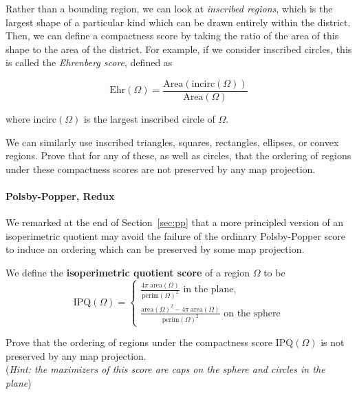 Rather than a bounding region, we can look at \textit{inscribed regions}, which is the largest  shape of a particular kind which can be drawn entirely within the district.  Then, we can define a compactness score by taking the ratio of the area of this shape to the area of the district.  For example, if we consider inscribed circles, this is called the \textit{Ehrenberg score}, defined as

$$\mathrm{Ehr}(\Omega) = \frac{\mathrm{Area}(\mathrm{incirc}(\Omega))}{\mathrm{Area}(\Omega)}$$

where $\mathrm{incirc}(\Omega)$ is the largest inscribed circle of $\Omega$.

We can similarly use inscribed triangles, squares, rectangles, ellipses, or convex regions.  Prove that for any of these, as well as circles, that the ordering of regions under these compactness scores are not preserved by any map projection.



\paragraph{Polsby-Popper, Redux}
We remarked at the end of Section~\ref{sec:pp} that a more principled version of an isoperimetric quotient may avoid the failure of the ordinary Polsby-Popper score to induce an ordering which can be preserved by some map projection.

	We define the \textbf{isoperimetric quotient score} of a region $\Omega$ to be$$
	\mathrm{IPQ}(\Omega)=
	\begin{cases}
	\frac{4\pi \ \mathrm{area}(\Omega)}{\mathrm{perim}(\Omega)^2} \text{ in the plane},\\[10pt]
	\frac{\mathrm{area}(\Omega)^2 - 4\pi \ \mathrm{area}(\Omega)}{\mathrm{perim}(\Omega)^2}\text{ on the sphere}
	\end{cases}
	$$

Prove that the ordering of regions  under the compactness score $\mathrm{IPQ}(\Omega)$ is not preserved by any map projection.\\ (\textit{Hint: the maximizers of this score are caps on the sphere and circles in the plane})
	
	
